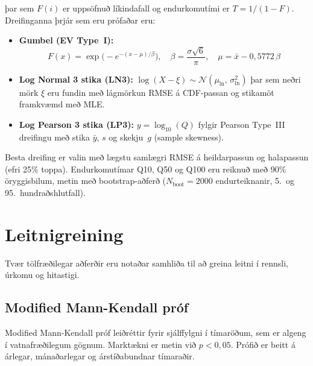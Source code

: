 \documentclass[12pt, a4paper]{article}
\begin{document}
þar sem $F(i)$ er uppsöfnuð líkindafall og endurkomutími er $T = 1/(1-F)$.
Dreifinganna þrjár sem eru prófaðar eru:

\begin{itemize}
    \item \textbf{Gumbel (EV Type~I):}
    \begin{equation}
        F(x) = \exp\!\bigl(-e^{-(x-\mu)/\beta}\bigr), \quad
        \beta = \frac{\sigma\sqrt{6}}{\pi}, \quad
        \mu = \bar{x} - 0{,}5772\,\beta
        \label{eq:gumbel}
    \end{equation}

    \item \textbf{Log Normal 3 stika (LN3):}
    $\log(X - \xi) \sim \mathcal{N}(\mu_{\ln},\, \sigma_{\ln}^2)$
    þar sem neðri mörk $\xi$ eru fundin með lágmörkun RMSE á CDF-passan
    og stikamöt framkvæmd með MLE.

    \item \textbf{Log Pearson 3 stika (LP3):}
    $y = \log_{10}(Q)$ fylgir Pearson Type~III dreifingu með stika
    $\bar{y}$, $s$ og skekju~$g$ (sample skewness).
\end{itemize}

Besta dreifing er valin með lægstu samlægri RMSE á heildarpassun og
halapassun (efri 25\% toppa). Endurkomutímar Q10, Q50 og Q100 eru reiknuð
með 90\% öryggisbilum, metin með bootstrap-aðferð
($N_{\mathrm{boot}} = 2000$ endurteiknanir, 5.\ og 95.\ hundraðshlutfall).

\section{Leitnigreining}

Tvær tölfræðilegar aðferðir eru notaðar samhliða til að greina leitni í
rennsli, úrkomu og hitastigi.

\subsection{Modified Mann-Kendall próf}

Modified Mann-Kendall próf \cite{Hamed1998} leiðréttir fyrir sjálffylgni í
tímaröðum, sem er algeng í vatnafræðilegum gögnum. Marktækni er metin við
$p < 0{,}05$. Prófið er beitt á árlegar, mánaðarlegar og árstíðabundnar
tímaraðir.
\end{document}

